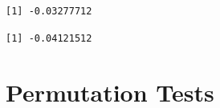 \documentclass[
  letterpaper,
  DIV=11,
  numbers=noendperiod]{scrreport}
\newenvironment{Shaded}{\begin{snugshade}}{\end{snugshade}}
\newcommand{\CommentTok}[1]{\textcolor[rgb]{0.37,0.37,0.37}{#1}}
\newcommand{\DecValTok}[1]{\textcolor[rgb]{0.68,0.00,0.00}{#1}}
\newcommand{\FunctionTok}[1]{\textcolor[rgb]{0.28,0.35,0.67}{#1}}
\newcommand{\NormalTok}[1]{\textcolor[rgb]{0.00,0.23,0.31}{#1}}
\newcommand{\SpecialCharTok}[1]{\textcolor[rgb]{0.37,0.37,0.37}{#1}}
\begin{document}
\begin{verbatim}
[1] -0.03277712
\end{verbatim}

\begin{Shaded}
\end{Shaded}

\begin{verbatim}
[1] -0.04121512
\end{verbatim}

\hypertarget{permutation-tests-1}{%
\section{Permutation Tests}\label{permutation-tests-1}}
\end{document}
